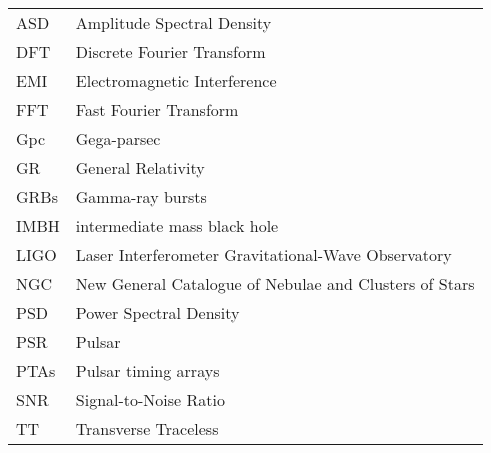 \begin{tabular}{ll}
    ASD & \hspace{2em} Amplitude Spectral Density \\
    DFT & \hspace{2em} Discrete Fourier Transform \\
    EMI & \hspace{2em} Electromagnetic Interference \\
    FFT & \hspace{2em} Fast Fourier Transform\\
    Gpc & \hspace{2em} Gega-parsec \\
    GR & \hspace{2em} General Relativity \\
    GRBs & \hspace{2em} Gamma-ray bursts \\
    IMBH & \hspace{2em} intermediate mass black hole \\
    LIGO & \hspace{2em} Laser Interferometer Gravitational-Wave Observatory  \\
    NGC & \hspace{2em} New General Catalogue of Nebulae and Clusters of Stars \\
    PSD & \hspace{2em} Power Spectral Density \\
    PSR & \hspace{2em} Pulsar \\
    PTAs & \hspace{2em} Pulsar timing arrays \\
    SNR & \hspace{2em} Signal-to-Noise Ratio \\
    TT & \hspace{2em} Transverse Traceless \\
\end{tabular}